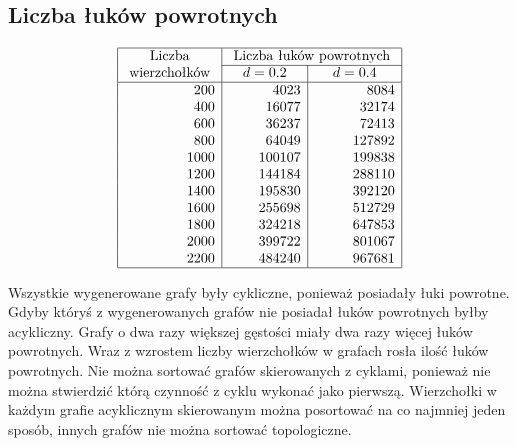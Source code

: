 \documentclass[polish,polish,a4paper]{article}
\begin{document}
\begin{spacing}{1.25}
\section{Liczba łuków powrotnych}

\begin{spacing}{1.5}
	\begin{equation*}
	\begin{array}{|r|r|r|}
	\hline
	\multicolumn{1}{|c|}{$ Liczba $}&\multicolumn{2}{c|}{$ Liczba łuków powrotnych $}\\\cline{2-3}
	\multicolumn{1}{|c|}{$ wierzchołków $}&	\multicolumn{1}{c|}{\quad d=0.2 \quad}&	\multicolumn{1}{c|}{d=0.4}\\
	\hline
	200&4023&8084\\
	400&16077&32174\\
	600&36237&72413\\
	800&64049&127892\\
	1000&100107&199838\\
	1200&144184&288110\\
	1400&195830&392120\\
	1600&255698&512729\\
	1800&324218&647853\\
	2000&399722&801067\\
	2200&484240&967681\\
	\hline
	\end{array}
	\end{equation*}
\end{spacing}

Wszystkie wygenerowane grafy były cykliczne, ponieważ posiadały łuki powrotne. Gdyby któryś z wygenerowanych grafów nie posiadał łuków powrotnych byłby acykliczny. Grafy o dwa razy większej gęstości miały dwa razy więcej łuków powrotnych. Wraz z wzrostem liczby wierzchołków w grafach rosła ilość łuków powrotnych.
Nie można sortować grafów skierowanych z cyklami, ponieważ nie można stwierdzić którą czynność z cyklu wykonać jako pierwszą.
Wierzchołki w każdym grafie acyklicznym skierowanym można posortować na co najmniej jeden sposób, innych grafów nie można sortować topologiczne.




\end{spacing}
\end{document}
